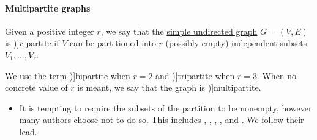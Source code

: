 \paragraph{Multipartite graphs}

\begin{definition}\label{def:multipartite_graph}
  Given a positive integer \( r \), we say that the \hyperref[def:undirected_graph]{simple undirected graph} \( G = (V, E) \) is \term[ru=\( r \)-дольный (граф) (\cite[11]{ЕмеличевИПр1990Графы})]{\( r \)-partite} if \( V \) can be \hyperref[def:set_partition]{partitioned} into \( r \) (possibly empty) \hyperref[def:graph_independent_set]{independent} subsets \( V_1, \ldots, V_r \).

  We use the term \term[ru=двудольный (граф) (\cite[11]{ЕмеличевИПр1990Графы})]{bipartite} when \( r = 2 \) and \term[ru=трёхдольный (граф) (\cite[11]{ЕмеличевИПр1990Графы})]{tripartite} when \( r = 3 \). When no concrete value of \( r \) is meant, we say that the graph is \term[en=multipartite (graph) (\cite[ex. 8.5.5]{Knauer2019AlgGraphTheory})]{multipartite}.
\end{definition}
\begin{itemize}
  \item It is tempting to require the subsets of the partition to be nonempty, however many authors choose not to do so. This includes , , , ,  and . We follow their lead.
\end{itemize}

